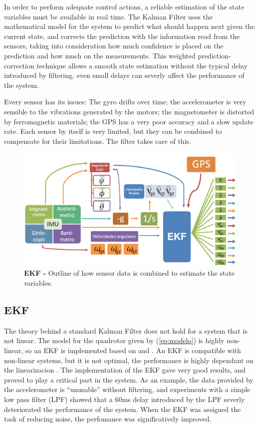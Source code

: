 \documentclass[conference]{IEEEtran}
\newcommand{\refp}[1]{(\ref{#1})}
\begin{document}
In order to perform adequate control actions, a reliable estimation of the state variables must be available in real time. The Kalman Filter uses the mathematical model for the system to predict what should happen next given the current state, and corrects the prediction with the information read from the sensors, taking into consideration how much confidence is placed on the prediction and how much on the measurements. This weighted prediction-correction technique allows a smooth state estimation without the typical delay introduced by filtering, even small delays can severly affect the performance of the system.

Every sensor has its issues: The gyro drifts over time; the accelerometer is very sensible to the vibrations generated by the motors; the magnetometer is distorted by ferromagnetic materials; the GPS has a very poor accuracy and a slow update rate. Each sensor by itself is very limited, but they can be combined to compensate for their limitations. The filter takes care of this.

\begin{figure}
	\centering
	\includegraphics[width=1\columnwidth]{../pics_kalman/diagrama_kalman_2.png}
	\caption{\textbf{EKF - } Outline of how sensor data is combined to estimate the state variables.}
	\label{fig:diagrama_kalman}
\end{figure}

\subsection{EKF}
\label{sec:kalman-ekf}

The theory behind a standard Kalman Filter does not hold for a system that is not linear. The model for the quadrotor given by \refp{eq:modelo} is highly non-linear, so an EKF is implemented based on \cite{bib:kalman} and \cite{bib:kalman2}. An EKF is compatible with non-linear systems, but it is not optimal, the performance is highly dependant on the linearizacion \cite{bib:kay}. The implementation of the EKF gave very good results, and proved to play a critical part in the system. As an example, the data provided by the accelerometer is ``unusable'' without filtering, and experiments with a simple low pass filter (LPF) showed that a 60ms delay introduced by the LPF severly deteriorated the performance of the system. When the EKF was assigned the task of reducing noise, the perfomance was significatively improved.
\end{document}

